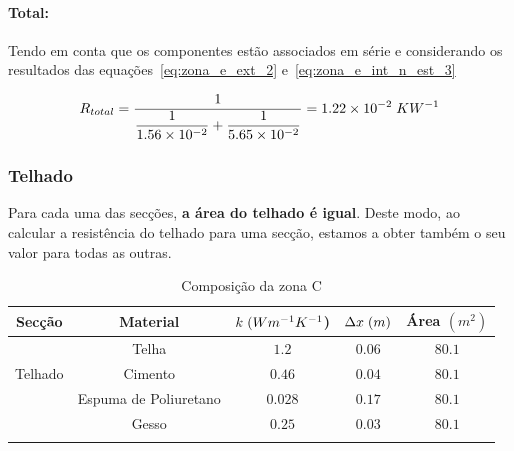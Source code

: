 \documentclass[12pt, a4paper]{article}
\begin{document}
\paragraph{Total:}\label{par:zona_e_total:} Tendo em conta que os componentes est\~ao
associados em série e considerando os resultados das
equa\c{c}\~oes~\ref{eq:zona_e_ext_2} e~\ref{eq:zona_e_int_n_est_3}

\begin{equation}
	R_{total} =
	\dfrac{1}{
		\dfrac{1}{
			1.56 \times 10^{-2}
		}	+
		\dfrac{1}{
			5.65 \times 10^{-2}
		}
	}
	= 1.22 \times 10^{-2} \hspace{1mm} KW^{-1}
	\label{eq:zona_e_total}
\end{equation}



\subsubsection{Telhado}\label{ssub:Telhado}

Para cada uma das secções, \textbf{a área do telhado é igual}. Deste modo, ao calcular a resistência do telhado
para uma secção, estamos a obter também o seu valor para todas as outras.
\begin{table}[htpb]
	\begin{center}
		\begin{tabular}{c c c c c}
			\toprule{}
			Secção                     & Material               & $ k \hspace{1mm} (Wm^{-1}K^{-1}$) & $ \Delta x \hspace{1mm} (m)$ & Área $(m^2) $ \\
				\midrule{}

			\multirow{5}{*}{}          & Telha                  & $1.2$                             & $0.06$                       & $80.1$        \\
				\cline{2-5}
			Telhado                    & Cimento				& $0.46$                            & $0.04$                       & $80.1$        \\
				\cline{2-5}
			                           & Espuma de Poliuretano  & $0.028$                           & $0.17$                       & $80.1$        \\
				\cline{2-5}
									   & Gesso				 	& $0.25$                            & $0.03$                       & $80.1$        \\
			\bottomrule{}
		\end{tabular}
	\end{center}
	\caption{Composição da zona C}\label{tab:telhado}
\end{table}
\end{document}
